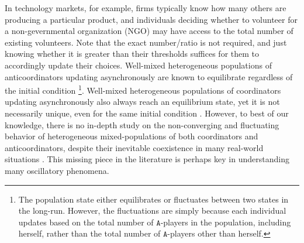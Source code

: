 \documentclass[10 pt,twocolumn,journal]{IEEEtran}
\theoremstyle{plain}
\newcommand{\A}{\mathcal{A}}
\renewcommand{\A}{\mathtt{A}}
\newcommand{\B}{\mathtt{B}}
\theoremstyle{definition}
\begin{document}
In technology markets, for example, firms typically know how many others are producing a particular product, and individuals deciding whether to volunteer for a non-gevernmental organization (NGO) may have access to the total number of existing volunteers. 
Note that the exact number/ratio is not required, and just knowing whether it is greater than their thresholds suffices for them to accordingly update their choices. 
Well-mixed heterogeneous populations of anticoordinators updating asynchronously are known to equilibrate regardless of the initial condition \cite{ramazi2018}\footnote{The population state either equilibrates or fluctuates between two states in the long-run. 
However, the fluctuations are simply because each individual updates based on the total number of $\A$-players in the population, including herself, rather than the total number of $\A$-players other than herself.}.
Well-mixed heterogeneous populations of coordinators updating asynchronously also always reach an equilibrium state, yet it is not necessarily unique, even for the same initial condition \cite{ramaziUnderReview}. 
However, to best of our knowledge, there is no in-depth study on the non-converging and fluctuating behavior of heterogeneous mixed-populations of both coordinators and anticoordinators, despite their inevitable coexistence in many real-world situations \cite{bodine2013}.
This missing piece in the literature is perhaps key in understanding many oscillatory phenomena. 
\end{document}
